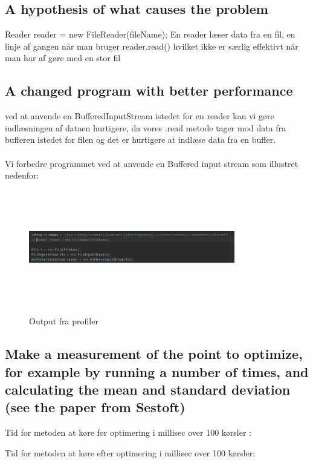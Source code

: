 \documentclass[12pt]{article}
\begin{document}
\subsection{A hypothesis of what causes the problem}
Reader reader = new FileReader(fileName);
En reader læser data fra en fil, en linje af gangen når man bruger reader.read() hvilket ikke er særlig effektivt når man har af gøre med en stor fil 

\subsection{A changed program with better performance}
ved at anvende en BufferedInputStream istedet for en reader kan vi gøre indlæsningen af dataen hurtigere, da vores .read metode tager mod data fra bufferen istedet for filen og det er hurtigere at indlæse data fra en buffer. \\ \\

Vi forbedre programmet ved at anvende en Buffered input stream som illustret nedenfor:

\begin{figure}[h!]
\begin{center}
\caption{Output fra profiler}
\includegraphics[width=9cm,height=5cm]{forandring.PNG}
\label{fig:cclogo}
\end{center}
\label{fig:firstFigureLabel}
\end{figure}


\subsection{Make a measurement of the point to optimize, for example by running a number of times, and calculating the mean and standard deviation (see the paper from Sestoft)}

Tid for metoden at køre før optimering i millisec over 100 kørsler :

\begin{equation}
[394, 394, 394, 394, 394, 394, 395, 395, 395, 395, 397, 397, 397, 397, 397, 397, 397, 397, 397, 397, 397, 397, 397, 398, 398, 398, 398, 398, 398, 398, 398, 398, 398, 398, 398, 398, 398, 398, 398, 398, 399, 399, 399, 399, 399, 399, 399, 399, 399, 399, 399, 399, 399, 399, 399, 399, 399, 399, 399, 399, 399, 399, 399, 402, 402, 402, 402, 402, 402, 405, 405, 405, 405, 405, 405, 405, 405, 405, 405, 405, 405, 405, 405, 405, 405, 405, 405, 405, 405, 405, 405, 405, 405, 406, 406, 406, 406, 407, 407, 407]
\end{equation}
Tid for metoden at køre efter optimering i millisec over 100 kørsler:
\end{document}

